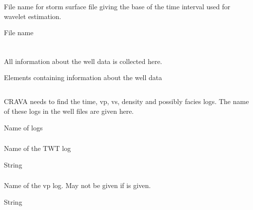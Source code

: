 \subsubsection{}
 \slist
   \item \Description File name for storm surface file giving the base of the time interval used for wavelet estimation.
   \item \Argument File name
   \item \Default
 \elist

\section{} 
 \slist
   \item \Description All information about the well data is collected here.
   \item \Argument Elements containing information about the well data
   \item \Default
 \elist

\subsection{} 
 \slist
   \item \Description CRAVA needs to find the time, vp, vs, density and possibly facies logs. The name of these logs in the well files are given here.
   \item \Argument Name of logs
   \item \Default
 \elist

\subsubsection{} 
 \slist
   \item \Description Name of the TWT log
   \item \Argument String
   \item \Default %
 \elist

\subsubsection{}
 \slist
   \item \Description Name of the vp log. May not be given if  is given.
   \item \Argument String
   \item \Default
 \elist

